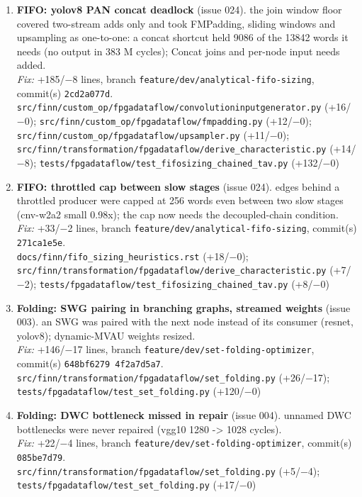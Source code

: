 \documentclass[a4paper,10pt]{article}
\begin{document}
\begin{enumerate}
\item \textbf{FIFO: yolov8 PAN concat deadlock} (issue 024). the join window floor covered two-stream adds only and took FMPadding, sliding windows and upsampling as one-to-one: a concat shortcut held 9086 of the 13842 words it needs (no output in 383 M cycles); Concat joins and per-node input needs added.\\
\emph{Fix:} +185/$-$8 lines, branch \texttt{feature/dev/analytical-fifo-sizing}, commit(s) \texttt{2cd2a077d}.\\
{\footnotesize \texttt{src/finn/custom\_op/fpgadataflow/convolutioninputgenerator.py} (+16/$-$0); \texttt{src/finn/custom\_op/fpgadataflow/fmpadding.py} (+12/$-$0); \texttt{src/finn/custom\_op/fpgadataflow/upsampler.py} (+11/$-$0); \texttt{src/finn/transformation/fpgadataflow/derive\_characteristic.py} (+14/$-$8); \texttt{tests/fpgadataflow/test\_fifosizing\_chained\_tav.py} (+132/$-$0)}
\item \textbf{FIFO: throttled cap between slow stages} (issue 024). edges behind a throttled producer were capped at 256 words even between two slow stages (cnv-w2a2 small 0.98x); the cap now needs the decoupled-chain condition.\\
\emph{Fix:} +33/$-$2 lines, branch \texttt{feature/dev/analytical-fifo-sizing}, commit(s) \texttt{271ca1e5e}.\\
{\footnotesize \texttt{docs/finn/fifo\_sizing\_heuristics.rst} (+18/$-$0); \texttt{src/finn/transformation/fpgadataflow/derive\_characteristic.py} (+7/$-$2); \texttt{tests/fpgadataflow/test\_fifosizing\_chained\_tav.py} (+8/$-$0)}
\item \textbf{Folding: SWG pairing in branching graphs, streamed weights} (issue 003). an SWG was paired with the next node instead of its consumer (resnet, yolov8); dynamic-MVAU weights resized.\\
\emph{Fix:} +146/$-$17 lines, branch \texttt{feature/dev/set-folding-optimizer}, commit(s) \texttt{648bf6279 4f2a7d5a7}.\\
{\footnotesize \texttt{src/finn/transformation/fpgadataflow/set\_folding.py} (+26/$-$17); \texttt{tests/fpgadataflow/test\_set\_folding.py} (+120/$-$0)}
\item \textbf{Folding: DWC bottleneck missed in repair} (issue 004). unnamed DWC bottlenecks were never repaired (vgg10 1280 -> 1028 cycles).\\
\emph{Fix:} +22/$-$4 lines, branch \texttt{feature/dev/set-folding-optimizer}, commit(s) \texttt{085be7d79}.\\
{\footnotesize \texttt{src/finn/transformation/fpgadataflow/set\_folding.py} (+5/$-$4); \texttt{tests/fpgadataflow/test\_set\_folding.py} (+17/$-$0)}

\end{enumerate}
\end{document}
